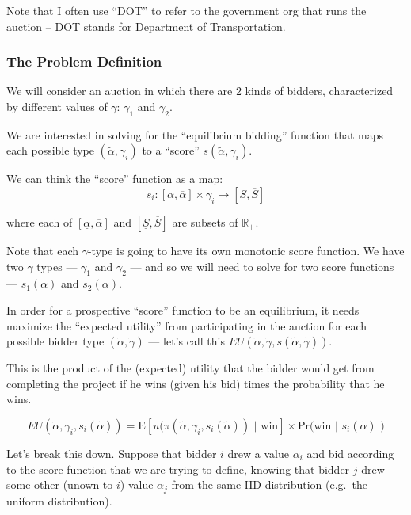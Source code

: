 \documentclass[
]{article}
\begin{document}
Note that I often use ``DOT'' to refer to the government org that runs
the auction -- DOT stands for Department of Transportation.

\hypertarget{the-problem-definition}{%
\subsubsection{The Problem Definition}\label{the-problem-definition}}

We will consider an auction in which there are \(2\) kinds of bidders,
characterized by different values of \(\gamma\): \(\gamma_1\) and
\(\gamma_2\).

We are interested in solving for the ``equilibrium bidding'' function
that maps each possible type \((\tilde{\alpha}, \gamma_i)\) to a
``score'' \(s(\tilde{\alpha}, {\gamma}_i)\).

We can think the ``score'' function as a map: \[
s_{i} : [\underline{\alpha}, \overline{\alpha}] \times \gamma_i \rightarrow [\underline{S}, \overline{S}]
\]

where each of \([\underline{\alpha}, \overline{\alpha}]\) and
\([\underline{S}, \overline{S}]\) are subsets of \(\mathbb{R}_{+}\).

Note that each \(\gamma\)-type is going to have its own monotonic score
function. We have two \(\gamma\) types --- \(\gamma_1\) and \(\gamma_2\)
--- and so we will need to solve for two score functions ---
\(s_1(\alpha)\) and \(s_2(\alpha)\).

In order for a prospective ``score'' function to be an equilibrium, it
needs maximize the ``expected utility'' from participating in the
auction for each possible bidder type
\((\tilde{\alpha}, \tilde{\gamma})\) --- let's call this
\(EU(\tilde{\alpha}, \tilde{\gamma}, s(\tilde{\alpha}, \tilde{\gamma}))\).

This is the product of the (expected) utility that the bidder would get
from completing the project if he wins (given his bid) times the
probability that he wins.

\[
EU(\tilde{\alpha}, {\gamma_i}, s_{i}(\tilde{\alpha})) = \text{E}[u(\pi(\tilde{\alpha}, {\gamma_i}, s_{i}(\tilde{\alpha})) \text{ | win}] \times \text{Pr(win | } s_{i}(\tilde{\alpha}) \text{ )}
\]

Let's break this down. Suppose that bidder \(i\) drew a value
\(\alpha_i\) and bid according to the score function that we are trying
to define, knowing that bidder \(j\) drew some other (unown to \(i\))
value \(\alpha_j\) from the same IID distribution (e.g.~the uniform
distribution).
\end{document}
